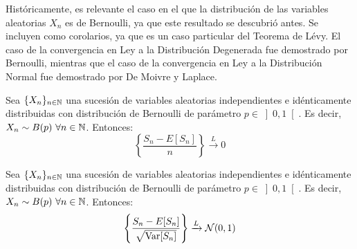 Históricamente, es relevante el caso en el que la distribución de las variables aleatorias $X_n$ es de Bernoulli, ya que este resultado se descubrió antes. Se incluyen como corolarios, ya que es un caso particular del Teorema de Lévy. El caso de la convergencia en Ley a la Distribución Degenerada fue demostrado por Bernoulli, mientras que el caso de la convergencia en Ley a la Distribución Normal fue demostrado por De Moivre y Laplace.
\begin{coro}
    Sea $\{X_n\}_{n\in \mathbb{N}}$ una sucesión de variables aleatorias independientes e idénticamente distribuidas con distribución de Bernoulli de parámetro $p\in \left]0,1\right[$. Es decir, $X_n\sim B(p)~\forall n\in \mathbb{N}$. Entonces:
    \begin{equation*}
        \left\{\frac{S_n - E[S_n]}{n}\right\} \xrightarrow{L} 0
    \end{equation*}
\end{coro}
\begin{coro}
    Sea $\{X_n\}_{n\in \mathbb{N}}$ una sucesión de variables aleatorias independientes e idénticamente distribuidas con distribución de Bernoulli de parámetro $p\in \left]0,1\right[$. Es decir, $X_n\sim B(p)~\forall n\in \mathbb{N}$. Entonces:
    \begin{equation*}
        \left\{\frac{S_n - E[S_n]}{\sqrt{\operatorname{Var}[S_n]}}\right\} \xrightarrow{L} \mathcal{N}(0,1)
    \end{equation*}
\end{coro}